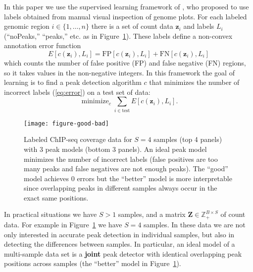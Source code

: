 \documentclass{article} %
\DeclareMathOperator*{\minimize}{minimize}
\newcommand{\ZZ}{\mathbb Z}
\begin{document}
In this paper we use the supervised learning framework of
\citet{hocking2014visual}, who proposed to use labels obtained from
manual visual inspection of genome plots. For each labeled genomic
region $i\in\{1, \dots, n\}$ there is a set of count data $\mathbf
z_i$ and labels $L_i$ (``noPeaks,'' ``peaks,'' etc. as in
Figure~\ref{fig:good-bad}). These labels define a non-convex
annotation error function
\begin{equation}
  \label{eq:error}
  E[c(\mathbf z_i),  L_i] =
  \text{FP}[c(\mathbf z_i), L_i] +
  \text{FN}[c(\mathbf z_i), L_i]
\end{equation}
which counts the number of false positive (FP) and false negative (FN)
regions, so it takes values in the non-negative integers. In this
framework the goal of learning is to find a peak detection algorithm
$c$ that minimizes the number of incorrect labels (\ref{eq:error}) on
a test set of data:
\begin{equation}
  \label{eq:min_error}
  \minimize_c \sum_{i\in\text{test}} E[c(\mathbf z_i),  L_i].
\end{equation}

\begin{figure}[b!]
  \centering
  \texttt{[image: figure-good-bad]}
  \vskip -0.5cm
  \caption{Labeled ChIP-seq coverage data for $S=4$ samples (top 4
    panels) with 3 peak models (bottom 3 panels).
    An ideal peak model minimizes the number of incorrect labels
    (false positives are too many peaks and false negatives are not
    enough peaks). The ``good'' model achieves 0 errors but the
    ``better'' model is more interpretable since overlapping peaks in
    different samples always occur in the exact same positions.}
  \label{fig:good-bad}
\end{figure}

In practical situations we have $S>1$ samples, and a matrix $\mathbf
Z\in\ZZ_+^{B\times S}$ of count data. For example in
Figure~\ref{fig:good-bad} we have $S=4$ samples. In these data we are
not only interested in accurate peak detection in individual samples,
but also in detecting the differences between samples. In particular,
an ideal model of a multi-sample data set is a \textbf{joint} peak
detector with identical overlapping peak positions across samples (the
``better'' model in Figure~\ref{fig:good-bad}).
\end{document}
